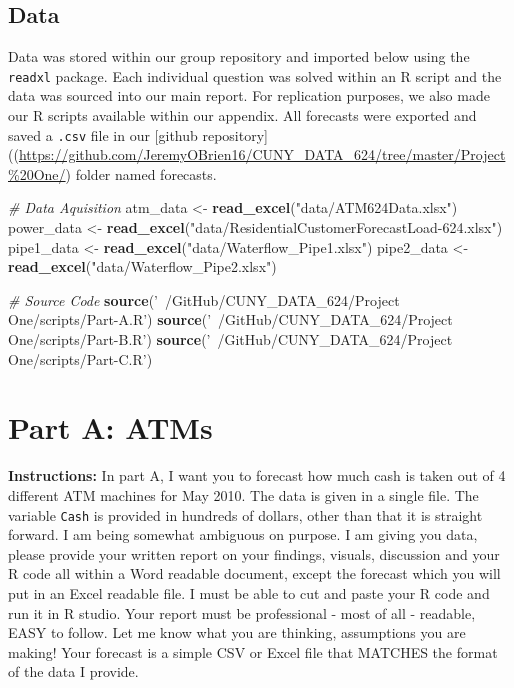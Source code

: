 \documentclass[openany]{book}
\newenvironment{Shaded}{\begin{snugshade}}{\end{snugshade}}
\newcommand{\CommentTok}[1]{\textcolor[rgb]{0.56,0.35,0.01}{\textit{#1}}}
\newcommand{\KeywordTok}[1]{\textcolor[rgb]{0.13,0.29,0.53}{\textbf{#1}}}
\newcommand{\NormalTok}[1]{#1}
\newcommand{\StringTok}[1]{\textcolor[rgb]{0.31,0.60,0.02}{#1}}
\renewenvironment{quote}{\begin{myquote}}{\end{myquote}}
\begin{document}
\hypertarget{data}{%
\section*{Data}\label{data}}

Data was stored within our group repository and imported below using the
\texttt{readxl} package. Each individual question was solved within an R
script and the data was sourced into our main report. For replication
purposes, we also made our R scripts available within our appendix. All
forecasts were exported and saved a \texttt{.csv} file in our {[}github
repository{]}((\url{https://github.com/JeremyOBrien16/CUNY_DATA_624/tree/master/Project\%20One/})
folder named forecasts.

\begin{Shaded}
\begin{Highlighting}[]
\CommentTok{# Data Aquisition}
\NormalTok{atm_data <-}\StringTok{ }\KeywordTok{read_excel}\NormalTok{(}\StringTok{"data/ATM624Data.xlsx"}\NormalTok{) }
\NormalTok{power_data <-}\StringTok{ }\KeywordTok{read_excel}\NormalTok{(}\StringTok{"data/ResidentialCustomerForecastLoad-624.xlsx"}\NormalTok{) }
\NormalTok{pipe1_data <-}\StringTok{ }\KeywordTok{read_excel}\NormalTok{(}\StringTok{"data/Waterflow_Pipe1.xlsx"}\NormalTok{)}
\NormalTok{pipe2_data <-}\StringTok{ }\KeywordTok{read_excel}\NormalTok{(}\StringTok{"data/Waterflow_Pipe2.xlsx"}\NormalTok{)}

\CommentTok{# Source Code}
\KeywordTok{source}\NormalTok{(}\StringTok{'~/GitHub/CUNY_DATA_624/Project One/scripts/Part-A.R'}\NormalTok{)}
\KeywordTok{source}\NormalTok{(}\StringTok{'~/GitHub/CUNY_DATA_624/Project One/scripts/Part-B.R'}\NormalTok{)}
\KeywordTok{source}\NormalTok{(}\StringTok{'~/GitHub/CUNY_DATA_624/Project One/scripts/Part-C.R'}\NormalTok{)}
\end{Highlighting}
\end{Shaded}

\hypertarget{part-a-atms}{%
\chapter{Part A: ATMs}\label{part-a-atms}}

\begin{quote}
\textbf{Instructions:} In part A, I want you to forecast how much cash
is taken out of 4 different ATM machines for May 2010. The data is given
in a single file. The variable \texttt{Cash} is provided in hundreds of
dollars, other than that it is straight forward. I am being somewhat
ambiguous on purpose. I am giving you data, please provide your written
report on your findings, visuals, discussion and your R code all within
a Word readable document, except the forecast which you will put in an
Excel readable file. I must be able to cut and paste your R code and run
it in R studio. Your report must be professional - most of all -
readable, EASY to follow. Let me know what you are thinking, assumptions
you are making! Your forecast is a simple CSV or Excel file that MATCHES
the format of the data I provide.
\end{quote}
\end{document}

